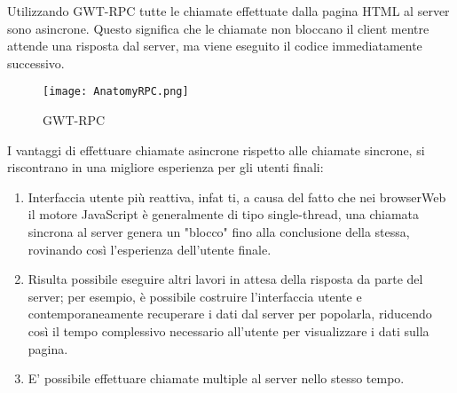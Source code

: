 Utilizzando  GWT-RPC  tutte  le  chiamate  effettuate  dalla  pagina  HTML  al  server 
sono  asincrone.
Questo  significa  che  le  chiamate  non  bloccano  il  client  mentre attende   una 
risposta   dal   server,   ma   viene  eseguito   il   codice   immediatamente 
successivo.
\begin{figure}[!htb]
\centering%
\texttt{[image: AnatomyRPC.png]}%
\caption{GWT-RPC }\label{fig:GWT-RPC}%
\end{figure}
I   vantaggi   di   effettuare   chiamate   asincrone   rispetto   alle   chiamate 
sincrone, si riscontrano in una migliore esperienza per gli utenti finali:
\begin{enumerate}
\item Interfaccia utente più reattiva, infat
ti, a causa del fatto che nei browserWeb il 
motore JavaScript è generalmente di tipo single-thread, una chiamata sincrona al 
server genera un "blocco" fino alla conclusione della stessa, rovinando così 
l’esperienza dell’utente finale.
\item Risulta possibile eseguire altri lavori in attesa della risposta da parte del server; 
per esempio, è possibile costruire l’interfaccia utente e contemporaneamente 
recuperare i dati dal server per popolarla, riducendo così il tempo complessivo 
necessario all’utente per visualizzare i dati sulla pagina.
\item E’ possibile effettuare chiamate multiple al server nello stesso tempo.
\end{enumerate}
